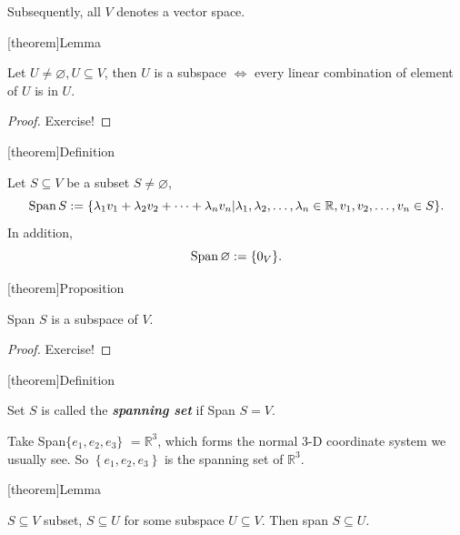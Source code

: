 \documentclass[12pt]{report}
\theoremstyle{definition}
\begin{document}
Subsequently, all $V$ denotes a vector space.

[theorem]{Lemma}
\begin{subspace and linear combination}
    Let $U \neq \varnothing, U \subseteq V$, then $U$ is a subspace $\iff$
    every linear combination of element of $U$ is in $U$.
\end{subspace and linear combination}

\begin{proof}
    Exercise!
\end{proof}

[theorem]{Definition}
\begin{span of a subset of vector space}
    Let $S \subseteq V$ be a subset $S \neq \varnothing$,\[
        \textnormal{Span}\,S:= \{\lambda_1 v_1 + \lambda_2 v_2 + \cdots + \lambda_n v_n |
        \lambda_1, \lambda_2, \ldots, \lambda_n \in \mathbb{R}, v_1, v_2, \ldots, v_n \in S\}.
    \]
    In addition, \[
        \textnormal{Span}\,\varnothing := \{0_V\}.
    \]
\end{span of a subset of vector space}

[theorem]{Proposition}
\begin{span S is a subspace}
    Span $S$ is a subspace of $V$.
\end{span S is a subspace}

\begin{proof}
    Exercise!
\end{proof}

[theorem]{Definition}
\begin{spanning set S}
    Set $S$ is called the \textbf{\emph{spanning set}} if Span $S = V$.
\end{spanning set S}

\begin{ex}
    Take Span$\{e_1, e_2, e_3\}$ $= \mathbb{R}^{3}$,
    which forms the normal 3-D coordinate system we usually see.
    So $\left\{e_1, e_2, e_3\right\}$ is the spanning set of $\mathbb{R}^{3}$.
\end{ex}

[theorem]{Lemma}
\begin{span of subset of subspace}\label{lemma:1}
    $S \subseteq V$ subset, $S \subseteq U$ for some subspace $U \subseteq V$.
    Then span $S \subseteq U$.
\end{span of subset of subspace}
\end{document}
